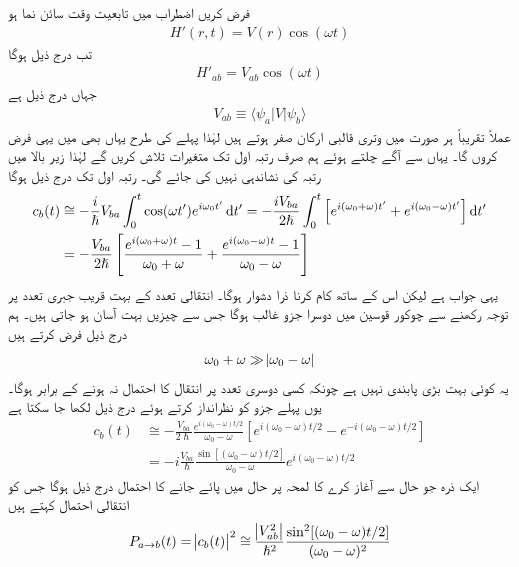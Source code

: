 فرض کریں اضطراب میں تابعیت وقت سائن نما ہو 
\begin{align}
	H'(r, t) = V(r)\cos(\omega t)
\end{align}
تب درج ذیل ہوگا
\begin{align}
	H'_{ab}=V_{ab}\cos(\omega t)
\end{align}
جہاں  درج ذیل ہے
\begin{align}
	V_{ab}\equiv\langle\psi_a| V|\psi_b\rangle
\end{align}
عملاً تقریباً ہر صورت میں وتری قالبی ارکان صفر ہوتے ہیں لہٰذا پہلے کی طرح یہاں بھی میں یہی فرض کروں گا۔ یہاں سے آگے چلتے ہوئے ہم صرف رتبہ اول تک متغیرات تلاش کریں گے لہٰذا زیر بالا میں رتبہ کی نشاندہی نہیں کی جائے گی۔ رتبہ اول تک درج ذیل ہوگا  
\begin{align}
	c_b(t) &\cong-\frac{i}{\hslash}V_{ba}\int_{0}^{t}\cos(\omega t')e^{i\omega_0 t'}\dif t' = -\frac{iV_{ba}}{2\hslash}\int_{0}^{t}\left[e^{i(\omega_0+\omega)t'}+e^{i(\omega_0-\omega)t'}\right]\dif t' \nonumber \\
	&=-\frac{V_{ba}}{2\hslash}\left[\frac{e^{i(\omega_0+\omega)t}-1}{\omega_0+\omega}+\frac{e^{i(\omega_0-\omega)t}-1}{\omega_0-\omega}\right]
\end{align}
یہی جواب ہے لیکن اس کے ساتھ کام کرنا ذرا دشوار ہوگا۔ انتقالی تعدد  کے بہت قریب جبری تعدد  پر توجہ رکھنے سے چوکور قوسین میں دوسرا جزو غالب ہوگا جس سے چیزیں بہت آسان ہو جاتی ہیں۔ ہم درج ذیل فرض کرتے ہیں
\begin{align}
	\omega_0+\omega\gg\abs{\omega_0-\omega}
\end{align}
یہ کوئی بہت بڑی پابندی نہیں ہے چونکہ کسی دوسری تعدد پر انتقال کا احتمال نہ ہونے کے برابر ہوگا۔ یوں پہلے جزو کو نظرانداز کرتے ہوئے درج ذیل لکھا جا سکتا ہے
\begin{align}
	c_b(t) &\cong-\frac{V_{ba}}{2\hslash}\frac{e^{i(\omega_0-\omega)t/2}}{\omega_0-\omega}\left[e^{i(\omega_0-\omega)t/2}-e^{-i(\omega_0-\omega)t/2}\right]\nonumber \\
	&=-i\frac{V_{ba}}{\hslash}\frac{\sin[(\omega_0-\omega)t/2]}{\omega_0-\omega}e^{i(\omega_0-\omega)t/2}
\end{align}
ایک ذرہ جو حال  سے آغاز کرے کا لمحہ پر حال  میں پائے جانے کا احتمال درج ذیل ہوگا جس کو انتقالی احتمال کہتے ہیں 
\begin{align}
	P_{a\to b}(t)=\abs{c_b(t)}^2\cong\frac{\abs{V_{ab}^2}}{\hslash^2}\frac{\sin^2[(\omega_0-\omega)t/2]}{(\omega_0-\omega)^2}
\end{align}
